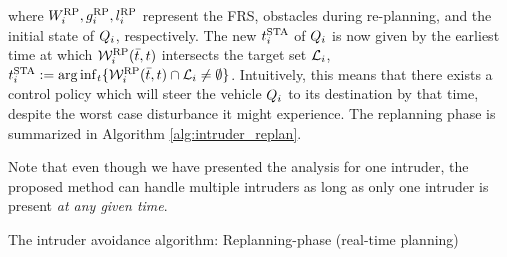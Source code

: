 \noindent where $W_i^{\text{RP}}, g_i^{\text{RP}}, l_i^{\text{RP}}$ represent the FRS, obstacles during re-planning, and the initial state of $Q_i$, respectively. The new $t^\text{STA}_i$ of $Q_i$ is now given by the earliest time at which $\mathcal{W}_i^{\text{RP}}(\bar{t}, t)$ intersects the target set $\mathcal{L}_i$, $t^\text{STA}_i := \arg \inf_t \{ \mathcal{W}_i^{\text{RP}}(\bar{t}, t) \cap \mathcal{L}_i \neq \emptyset \}$. Intuitively, this means that there exists a control policy which will steer the vehicle $Q_i$ to its destination by that time, despite the worst case disturbance it might experience. The replanning phase is summarized in Algorithm \ref{alg:intruder_replan}.
\begin{remark}
Note that even though we have presented the analysis for one intruder, the proposed method can handle multiple intruders as long as only one intruder is present \textit{at any given time}.
\end{remark}
%
\begin{algorithm}
	\DontPrintSemicolon
	\caption{The intruder avoidance algorithm: Replanning-phase (real-time planning)}
	\label{alg:intruder_replan}
\end{algorithm}
